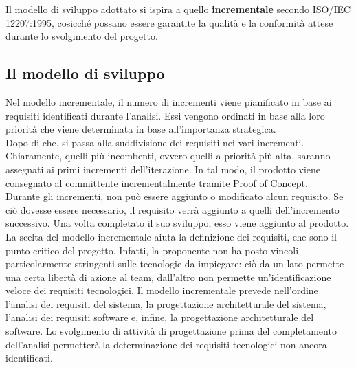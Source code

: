 Il modello di sviluppo adottato si ispira a quello \textbf{incrementale} secondo ISO/IEC 12207:1995, cosicché possano essere garantite la qualità e la conformità attese durante lo svolgimento del progetto.

\subsection{Il modello di sviluppo}
Nel modello incrementale, il numero di incrementi viene pianificato in base ai requisiti identificati durante l'analisi. Essi vengono ordinati in base alla loro priorità che viene determinata in base all'importanza strategica.\\
Dopo di che, si passa alla suddivisione dei requisiti nei vari incrementi. Chiaramente, quelli più incombenti, ovvero quelli a priorità più alta, saranno assegnati ai primi incrementi dell'iterazione. In tal modo, il prodotto viene consegnato al committente incrementalmente tramite Proof of Concept.\\
Durante gli incrementi, non può essere aggiunto o modificato alcun requisito. Se ciò dovesse essere necessario, il requisito verrà aggiunto a quelli dell'incremento successivo. Una volta completato il suo sviluppo, esso viene aggiunto al prodotto.\\
La scelta del modello incrementale aiuta la definizione dei requisiti, che sono il punto critico del progetto. Infatti, la proponente non ha posto vincoli particolarmente stringenti sulle tecnologie da impiegare: ciò da un lato permette una certa libertà di azione al team, dall'altro non permette un'identificazione veloce dei requisiti tecnologici. Il modello incrementale prevede nell'ordine l'analisi dei requisiti del sistema, la progettazione architetturale del sistema, l'analisi dei requisiti software e, infine, la progettazione architetturale del software. Lo svolgimento di attività di progettazione prima del completamento dell'analisi permetterà la determinazione dei requisiti tecnologici non ancora identificati.

